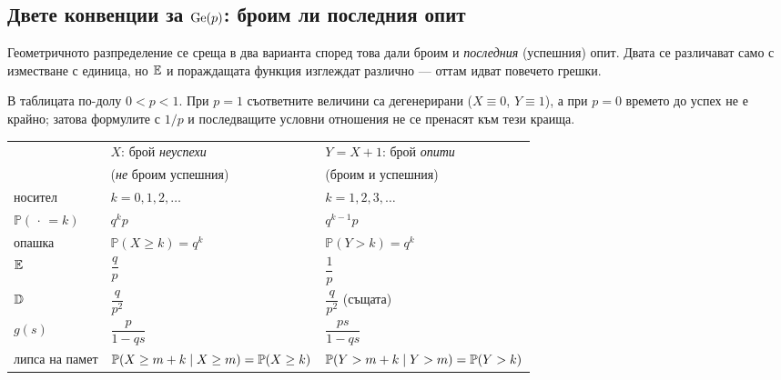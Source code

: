 \subsection*{Двете конвенции за $\operatorname{Ge}(p)$: броим ли последния опит}

Геометричното разпределение се среща в два варианта според това дали броим и
\emph{последния} (успешния) опит. Двата се различават само с изместване с единица, но
$\mathbb{E}$ и пораждащата функция изглеждат различно — оттам идват повечето грешки.

В таблицата по-долу $0<p<1$. При $p=1$ съответните величини са дегенерирани
($X\equiv0$, $Y\equiv1$), а при $p=0$ времето до успех не е крайно; затова
формулите с $1/p$ и последващите условни отношения не се пренасят към тези краища.

\begin{center}
\footnotesize
\setlength{\tabcolsep}{5pt}
\begin{tabular}{@{}lll@{}}
\toprule
 & $X$: брой \emph{неуспехи} & $Y = X+1$: брой \emph{опити} \\
 & (\emph{не} броим успешния) & (броим и успешния) \\
\midrule
носител & $k = 0,1,2,\dots$ & $k = 1,2,3,\dots$ \\[2pt]
$\mathbb{P}(\,\cdot\, = k)$ & $q^k p$ & $q^{k-1} p$ \\[2pt]
опашка & $\mathbb{P}(X \ge k) = q^{k}$ & $\mathbb{P}(Y > k) = q^{k}$ \\[2pt]
$\mathbb{E}$ & $\dfrac{q}{p}$ & $\dfrac{1}{p}$ \\[6pt]
$\mathbb{D}$ & $\dfrac{q}{p^2}$ & $\dfrac{q}{p^2}$ (същата) \\[6pt]
$g(s)$ & $\dfrac{p}{1-qs}$ & $\dfrac{ps}{1-qs}$ \\[6pt]
липса на памет & $\mathbb{P}(X \ge m+k \mid X \ge m) = \mathbb{P}(X \ge k)$
               & $\mathbb{P}(Y > m+k \mid Y > m) = \mathbb{P}(Y > k)$ \\
\bottomrule
\end{tabular}
\end{center}

